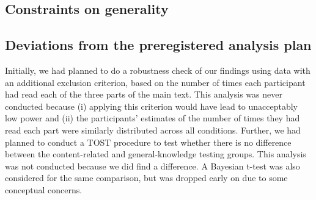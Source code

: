 \hypertarget{constraints-on-generality}{%
\subsection{Constraints on generality}\label{constraints-on-generality}}

\hypertarget{deviations-from-the-preregistered-analysis-plan}{%
\subsection{Deviations from the preregistered analysis
plan}\label{deviations-from-the-preregistered-analysis-plan}}

Initially, we had planned to do a robustness check of our findings using
data with an additional exclusion criterion, based on the number of
times each participant had read each of the three parts of the main
text. This analysis was never conducted because (i) applying this
criterion would have lead to unacceptably low power and (ii) the
participants' estimates of the number of times they had read each part
were similarly distributed across all conditions. Further, we had
planned to conduct a TOST procedure to test whether there is no
difference between the content-related and general-knowledge testing
groups. This analysis was not conducted because we did find a
difference. A Bayesian t-test was also considered for the same
comparison, but was dropped early on due to some conceptual concerns.


